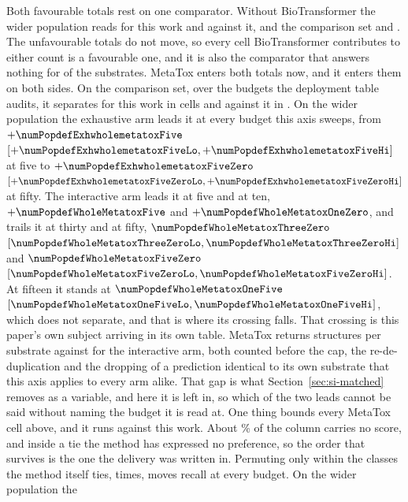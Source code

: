 \documentclass[journal=jcisd8,manuscript=suppinfo,layout=onecolumn]{achemso}
\begin{document}
Both favourable totals rest on one comparator. Without BioTransformer the wider population reads
\numPopdefWithoutbtforwholeWord{} for this work and \numPopdefWithoutbtagainstwholeWord{} against
it, and the comparison set \numPopdefWithoutbtforcompWord{} and
\numPopdefWithoutbtagainstcompWord{}. The unfavourable totals do not move, so every cell
BioTransformer contributes to either count is a favourable one, and it is also the comparator that
answers nothing for \numPopdefBtsilent{} of the \numPopdefWholesubs{} substrates. MetaTox enters
both totals now, and it enters them on both sides. On the comparison set, over the
\numPopdefMetatoxbudgetsWord{} budgets the deployment table audits, it separates for this work in
\numPopdefMetatoxforWord{} cells and against it in \numPopdefMetatoxagainstWord{}. On the wider
population the exhaustive arm leads it at every budget this axis sweeps, from
$+\numPopdefExhwholemetatoxFive$ $[+\numPopdefExhwholemetatoxFiveLo,
+\numPopdefExhwholemetatoxFiveHi]$ at five to $+\numPopdefExhwholemetatoxFiveZero$
$[+\numPopdefExhwholemetatoxFiveZeroLo, +\numPopdefExhwholemetatoxFiveZeroHi]$ at fifty. The
interactive arm leads it at five and at ten, $+\numPopdefWholeMetatoxFive$ and
$+\numPopdefWholeMetatoxOneZero$, and trails it at thirty and at fifty,
$\numPopdefWholeMetatoxThreeZero$ $[\numPopdefWholeMetatoxThreeZeroLo,
\numPopdefWholeMetatoxThreeZeroHi]$ and $\numPopdefWholeMetatoxFiveZero$
$[\numPopdefWholeMetatoxFiveZeroLo, \numPopdefWholeMetatoxFiveZeroHi]$. At fifteen it stands at
$\numPopdefWholeMetatoxOneFive$ $[\numPopdefWholeMetatoxOneFiveLo,
\numPopdefWholeMetatoxOneFiveHi]$, which does not separate, and that is where its crossing
falls. That crossing is this paper's own subject arriving in its own
table. MetaTox returns \numPopdefMetatoxcolumnoutput{} structures per substrate against
\numPopdefDeployedpoolwhole{} for the interactive arm, both counted before the cap, the
re-de-duplication and the dropping of a prediction identical to its own substrate that this axis
applies to every arm alike. That gap is what Section~\ref{sec:si-matched} removes as a variable,
and here it is left in, so which of the two leads cannot be said without naming the budget it is
read at. One thing bounds every MetaTox cell above, and it
runs against this work. About \numPopdefMetatoxscoredshare{}\% of the column carries no score, and
inside a tie the method has expressed no preference, so the order that survives is the one the
delivery was written in. Permuting only within the classes the method itself ties,
\numPopdefTiebreakperms{} times, moves recall at every budget. On the wider population the
\end{document}
